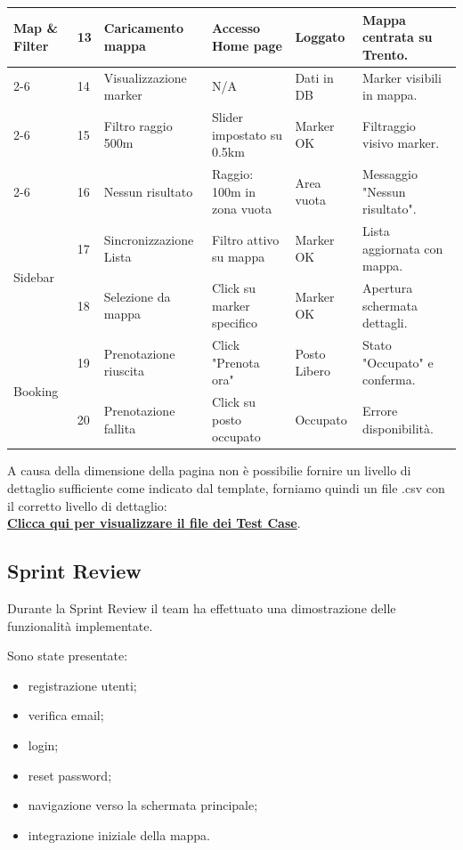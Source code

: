 \documentclass[12pt,a4paper]{article}
\begin{document}
\begin{longtable}{|p{2.2cm}|p{0.6cm}|p{3.2cm}|p{2.8cm}|p{1.8cm}|p{3.2cm}|}
\multirow{4}{=}{Map \& Filter} & 13 & Caricamento mappa & Accesso Home page & Loggato & Mappa centrata su Trento. \\ \cline{2-6}
 & 14 & Visualizzazione marker & N/A & Dati in DB & Marker visibili in mappa. \\ \cline{2-6}
 & 15 & Filtro raggio 500m & Slider impostato su 0.5km & Marker OK & Filtraggio visivo marker. \\ \cline{2-6}
 & 16 & Nessun risultato & Raggio: 100m in zona vuota & Area vuota & Messaggio "Nessun risultato". \\ \hline

\multirow{2}{=}{Sidebar} & 17 & Sincronizzazione Lista & Filtro attivo su mappa & Marker OK & Lista aggiornata con mappa. \\ \cline{2-6}
 & 18 & Selezione da mappa & Click su marker specifico & Marker OK & Apertura schermata dettagli. \\ \hline
\multirow{2}{=}{Booking} & 19 & Prenotazione riuscita & Click "Prenota ora" & Posto Libero & Stato "Occupato" e conferma. \\ \cline{2-6}
 & 20 & Prenotazione fallita & Click su posto occupato & Occupato & Errore disponibilità. \\ \hline

\end{longtable}
\normalsize

A causa della dimensione della pagina non è possibilie fornire un livello di dettaglio sufficiente come indicato dal template, forniamo quindi un file .csv con il corretto livello di dettaglio:\\
\href{https://docs.google.com/spreadsheets/d/1MUQECu_8l71_o3VYYRUg6efop6524kugg39CWwuaUdM/edit?usp=sharing}{\textbf{Clicca qui per visualizzare il file dei Test Case}}.

\subsection{Sprint Review}

Durante la Sprint Review il team ha effettuato una dimostrazione delle funzionalità implementate.

Sono state presentate:

\begin{itemize}
    \item registrazione utenti;
    \item verifica email;
    \item login;
    \item reset password;
    \item navigazione verso la schermata principale;
    \item integrazione iniziale della mappa.
\end{itemize}
\end{document}
